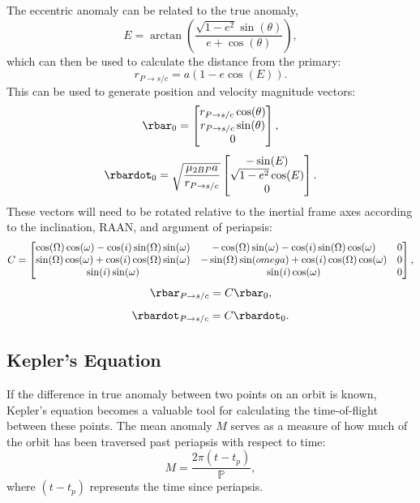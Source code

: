 The eccentric anomaly can be related to the true anomaly,
\begin{equation}
    E=\arctan(\frac{\sqrt{1-e^{2}}\sin(\theta)}{e+\cos(\theta)}),
    \label{eq:eccentricanomaly}
\end{equation}
which can then be used to calculate the distance from the primary:
\begin{equation}
    r_{P\rightarrow s/c}=a(1-e\cos(E)).
    \label{eq:circularradius}
\end{equation}
This can be used to generate position and velocity magnitude vectors:
\begin{equation}
    \rbar_{0}=\begin{bmatrix}r_{P\rightarrow s/c}\cos(\theta)\cr r_{P\rightarrow s/c}\sin(\theta)\cr0\end{bmatrix},
    \label{eq:circularpositionvector}
\end{equation}
\begin{equation}
    \rbardot_{0}=\sqrt{\frac{\mu_{2BP}a}{r_{P\rightarrow s/c}}}\begin{bmatrix}-\sin(E)\cr\sqrt{1-e^{2}}\cos(E)\cr0\end{bmatrix}.
    \label{eq:circularvelocityvector}
\end{equation}
These vectors will need to be rotated relative to the inertial frame axes according to the
inclination, RAAN, and argument of periapsis:
\begin{equation}
    C=\begin{bmatrix}\cos(\Omega)\cos(\omega)-\cos(i)\sin(\Omega)\sin(\omega)&-\cos(\Omega)\sin(\omega)-\cos(i)\sin(\Omega)\cos(\omega)&0\cr\sin(\Omega)\cos(\omega)+\cos(i)\cos(\Omega)\sin(\omega)&-\sin(\Omega)\sin(omega)+\cos(i)\cos(\Omega)\cos(\omega)&0\cr\sin(i)\sin(\omega)&\sin(i)\cos(\omega)&0\end{bmatrix},
    \label{eq:elementrotation}
\end{equation}
\begin{equation}
    \rbar_{P\rightarrow s/c}=C\rbar_{0},
    \label{eq:positionvector}
\end{equation}
\begin{equation}
    \rbardot_{P\rightarrow s/c}=C\rbardot_{0}.
    \label{eq:velocityvector}
\end{equation}

\subsection{Kepler's Equation}
If the difference in true anomaly between two points on an orbit is known, Kepler's equation
becomes a valuable tool for calculating the time-of-flight between these points. The mean anomaly
$M$ serves as a measure of how much of the orbit has been traversed past periapsis with respect to
time:
\begin{equation}
    M=\frac{2\pi(t-t_{p})}{\mathbb{P}},
    \label{eq:meananomaly}
\end{equation}
where $(t-t_{p})$ represents the time since periapsis.

